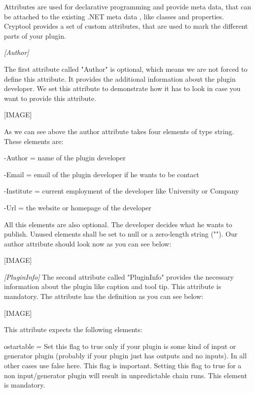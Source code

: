 Attributes are used for declarative programming and provide meta data, that can be attached to the existing .NET meta data , like classes and properties. Cryptool provides a set of custom attributes, that are used to mark the different parts of your plugin.

\textit{[Author]}

The first attribute called "Author" is optional, which means we are not forced to define this attribute. It provides the additional information about the plugin developer. We set this attribute to demonstrate how it has to look in case you want to provide this attribute.

[IMAGE]

As we can see above the author attribute takes four elements of type string. These elements are:

\hspace{20pt}-Author = name of the plugin developer

\hspace{20pt}-Email = email of the plugin developer if he wants to be contact

\hspace{20pt}-Institute = current employment of the developer like University or Company

\hspace{20pt}-Url = the website or homepage of the developer

All this elements are also optional. The developer decides what he wants to publish. Unused elements shall be set to null or a zero-length string ("").
Our author attribute should look now as you can see below:

[IMAGE]

\textit{[PluginInfo]}
The second attribute called "PluginInfo" provides the necessary information about the plugin like caption and tool tip. This attribute is mandatory. The attribute has the definition as you can see below:

[IMAGE]

This attribute expects the following elements:

\hspace{20pt}o\hspace{10pt}startable = 
Set this flag to true only if your plugin is some kind of input or generator plugin (probably if your plugin just has outputs and no inputs). In all other cases use false here. This flag is important. Setting this flag to true for a non input/generator plugin will result in unpredictable chain runs. This element is mandatory.

